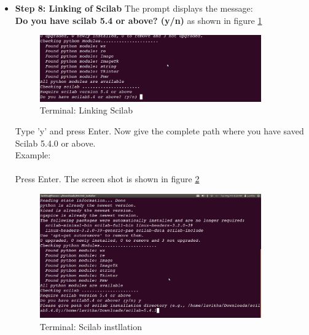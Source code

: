\begin{itemize}
\item{\textbf{Step 8: Linking of Scilab}}
The prompt displays the message:\\
\textbf{Do you have scilab 5.4 or above? (y/n)} as shown in figure \ref{link}
\begin{figure}[h]
\centering
\includegraphics[width=0.9\textwidth]{figures/install6.png}
\caption{Terminal: Linking Scilab}
\label{link}
\end{figure}
\newpage
Type 'y' and press Enter. Now give the complete path where you have saved Scilab 5.4.0 or above.\\
\newline
Example:\\
\textbf{}\\
\newline
Press Enter. 
The screen shot is shown in figure \ref{path}\\
\newline
\begin{figure}[h]
\centering
\includegraphics[width=0.9\textwidth]{figures/install7.png}
\caption{Terminal: Scilab instllation}
\label{path}
\end{figure}
\end{itemize}
